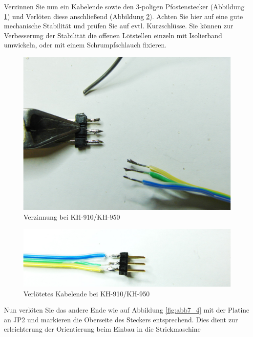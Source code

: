 \documentclass[fleqn,10pt]{SelfArx} %
\begin{document}
Verzinnen Sie nun ein Kabelende sowie den 3-poligen Pfostenstecker (Abbildung \ref{fig:abb7_2}) und Verlöten diese anschließend (Abbildung \ref{fig:abb7_3}). Achten Sie hier auf eine gute mechanische Stabilität und prüfen Sie auf evtl. Kurzschlüsse. Sie können zur Verbesserung der Stabilität die offenen Lötstellen einzeln mit Isolierband umwickeln, oder mit einem Schrumpfschlauch fixieren.

\begin{figure}[tbhp]\centering
\includegraphics[width=\linewidth]{abb7_2}
\caption{Verzinnung bei KH-910/KH-950}
\label{fig:abb7_2}
\end{figure}

\begin{figure}[tbhp]\centering
\includegraphics[width=\linewidth]{abb7_3}
\caption{Verlötetes Kabelende bei KH-910/KH-950}
\label{fig:abb7_3}
\end{figure}

Nun verlöten Sie das andere Ende wie auf Abbildung \ref{fig:abb7_4} mit der Platine an JP2 und markieren die Oberseite des Steckers entsprechend. Dies dient zur erleichterung der Orientierung beim Einbau in die Strickmaschine\par
\end{document}
